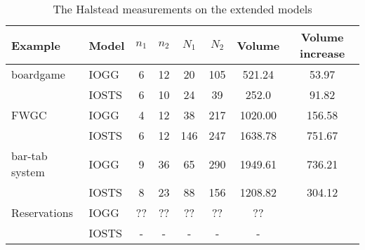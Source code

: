 \begin{table}[ht]
\begin{center}
\begin{tabular}{| l | l | c | c | c | c | c | c |}
  \hline
  \textbf{Example} & \textbf{Model} & $n_1$ & $n_2$ & $N_1$ & $N_2$ & Volume & Volume increase \\ \hline
  boardgame & IOGG & 6 & 12 & 20 & 105 & 521.24 & 53.97 \\ \cline{2-7}
  & IOSTS & 6 & 10 & 24 & 39 & 252.0 & 91.82\\ \hline
  FWGC & IOGG & 4 & 12 & 38 & 217 & 1020.00 & 156.58 \\ \cline{2-7}
  & IOSTS & 6 & 12 & 146 & 247 & 1638.78 & 751.67\\ \hline
  bar-tab system & IOGG & 9 & 36 & 65 & 290 & 1949.61 & 736.21 \\ \cline{2-7}
  & IOSTS & 8 & 23 & 88 & 156 & 1208.82 & 304.12 \\ \hline
  Reservations & IOGG & ?? & ?? & ?? & ?? & ?? \\ \cline{2-7}
  & IOSTS & - & - & - & - & - \\ \hline
\end{tabular}
\end{center}
\caption{The Halstead measurements on the extended models}
\label{tab:halstead-extended}
\end{table}

\begin{comment}
A recent extension on the protocol allows multiple accounts. While an account is not in state open, an idle account can be opened. This allows for a customer to scan his/her products, while another customer pays. Figure~\ref{fig:gg-fwgc-extended} shows the changes to the initial graph and the open account rules. Figure~\ref{fig:close-account-success-ext} shows the success response rule for closing an account: the order of closed accounts have to be kept, because the accounts have to be paid in that order.

\begin{figure}[ht]
  \begin{center}
    \subfloat[The initial graph]{\label{fig:start-scrp-ext}}\hspace{20px}
    \subfloat[The open account success rule]{\label{fig:open-account-success-ext}}\\
    \subfloat[The open account invalid rule]{\label{fig:open-account-invalid-ext}}\hspace{20px}
    \subfloat[The close account success rule]{\label{fig:close-account-success-ext}}
  \end{center}
  \caption{Parts of the extended IOGG of Scanflow Cash Register Protocol}
  \label{fig:gg-fwgc-extended}
\end{figure}
\end{comment}

